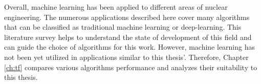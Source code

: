 
Overall, machine learning has been applied to different areas of nuclear engineering.
The numerous applications described here cover many algorithms that can be classified as traditional machine learning or deep-learning.
This literature survey helps to understand the state of development of this field and can guide the choice of algorithms for this work.
However, machine learning has not been yet utilized in applications similar to this thesis'.
Therefore, Chapter \ref{ch:tf} compares various algorithms performance and analyzes their suitability to this thesis.
